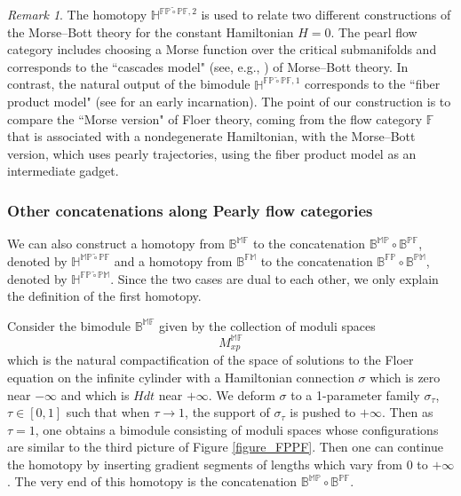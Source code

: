 \documentclass[reqno, 10pt]{amsart}
\numberwithin{equation}{section}
\numberwithin{equation}{section}
\theoremstyle{definition}
\theoremstyle{remark}
\newtheorem{rem}[thm]{Remark}
\newcommand{\beqn}{\begin{equation*}}
\newcommand{\eeqn}{\end{equation*}}
\newcommand{\mb}{\mathbb}
\begin{document}
\begin{rem}
    The homotopy $\mb{H}^{\mb{FP}\tilde\circ\mb{PF},2}$ is used to relate two different constructions of the Morse--Bott theory for the constant Hamiltonian $H = 0$. The pearl flow category includes choosing a Morse function over the critical submanifolds and corresponds to the ``cascades model" (see, e.g., \cite{Bourgeois-thesis}) of Morse--Bott theory. In contrast, the natural output of the bimodule $\mb{H}^{\mb{FP}\tilde\circ\mb{PF},1}$ corresponds to the ``fiber product model" (see \cite{Austin-Braam} for an early incarnation). The point of our construction is to compare the ``Morse version" of Floer theory, coming from the flow category $\mb{F}$ that is associated with a nondegenerate Hamiltonian, with the Morse--Bott version, which uses pearly trajectories, using the fiber product model as an intermediate gadget.
\end{rem}



























\subsubsection{Other concatenations along Pearly flow categories}

We can also construct a homotopy from $\mb{B}^{\mb{MF}}$ to the concatenation $\mb{B}^{\mb{MP}} \circ \mb{B}^{\mb{PF}}$, denoted by ${\mb H}^{\mb{MP} \tilde\circ \mb{PF}}$ and a homotopy from $\mb{B}^{\mb{FM}}$ to the concatenation $\mb{B}^{\mb{FP}} \circ \mb{B}^{\mb{PM}}$, denoted by $\mb{H}^{\mb{FP}\tilde\circ\mb{PM}}$. Since the two cases are dual to each other, we only explain the definition of the first homotopy. 

Consider the bimodule $\mb{B}^{\mb{MF}}$ given by the collection of moduli spaces
\beqn
M_{xp}^{\mb{MF}}
\eeqn
which is the natural compactification of the space of solutions to the Floer equation on the infinite cylinder with a Hamiltonian connection $\sigma$ which is zero near $-\infty$ and which is $H dt$ near $+\infty$. We deform $\sigma$ to a 1-parameter family $\sigma_\tau$, $\tau \in [0, 1]$ such that when $\tau \to 1$, the support of $\sigma_\tau$ is pushed to $+\infty$. Then as $\tau = 1$, one obtains a bimodule consisting of moduli spaces whose configurations are similar to the third picture of Figure \ref{figure_FPPF}. Then one can continue the homotopy by inserting gradient segments of lengths which vary from $0$ to $+\infty$. The very end of this homotopy is the concatenation $\mb{B}^{\mb{MP}} \circ \mb{B}^{\mb{PF}}$.
\end{document}
